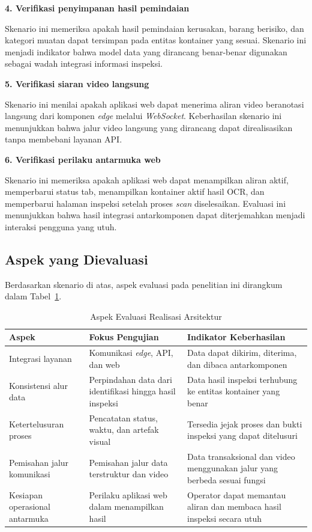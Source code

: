 \textbf{4. Verifikasi penyimpanan hasil pemindaian}

Skenario ini memeriksa apakah hasil pemindaian kerusakan, barang berisiko, dan
kategori muatan dapat tersimpan pada entitas kontainer yang sesuai. Skenario ini
menjadi indikator bahwa model data yang dirancang benar-benar digunakan sebagai
wadah integrasi informasi inspeksi.

\textbf{5. Verifikasi siaran video langsung}

Skenario ini menilai apakah aplikasi web dapat menerima aliran video
beranotasi langsung dari komponen \textit{edge} melalui \textit{WebSocket}.
Keberhasilan skenario ini menunjukkan bahwa jalur video langsung yang dirancang
dapat direalisasikan tanpa membebani layanan API.

\textbf{6. Verifikasi perilaku antarmuka web}

Skenario ini memeriksa apakah aplikasi web dapat menampilkan aliran aktif,
memperbarui status tab, menampilkan kontainer aktif hasil OCR, dan memperbarui
halaman inspeksi setelah proses \textit{scan} diselesaikan. Evaluasi ini
menunjukkan bahwa hasil integrasi antarkomponen dapat diterjemahkan menjadi
interaksi pengguna yang utuh.

\subsection{Aspek yang Dievaluasi}
\label{subsec:aspek-dievaluasi}

Berdasarkan skenario di atas, aspek evaluasi pada penelitian ini dirangkum
dalam Tabel~\ref{tbl:aspek-evaluasi}.

\begin{table}[ht]
    \centering
    \small
    \caption{Aspek Evaluasi Realisasi Arsitektur}
    \label{tbl:aspek-evaluasi}
    \begin{tabular}{p{} p{} p{}}
        \toprule
        \textbf{Aspek} & \textbf{Fokus Pengujian} & \textbf{Indikator Keberhasilan} \\
        \midrule
        Integrasi layanan & Komunikasi \textit{edge}, API, dan web & Data dapat dikirim, diterima, dan dibaca antarkomponen \\
        Konsistensi alur data & Perpindahan data dari identifikasi hingga hasil inspeksi & Data hasil inspeksi terhubung ke entitas kontainer yang benar \\
        Ketertelusuran proses & Pencatatan status, waktu, dan artefak visual & Tersedia jejak proses dan bukti inspeksi yang dapat ditelusuri \\
        Pemisahan jalur komunikasi & Pemisahan jalur data terstruktur dan video & Data transaksional dan video menggunakan jalur yang berbeda sesuai fungsi \\
        Kesiapan operasional antarmuka & Perilaku aplikasi web dalam menampilkan hasil & Operator dapat memantau aliran dan membaca hasil inspeksi secara utuh \\
        \bottomrule
    \end{tabular}
\end{table}

